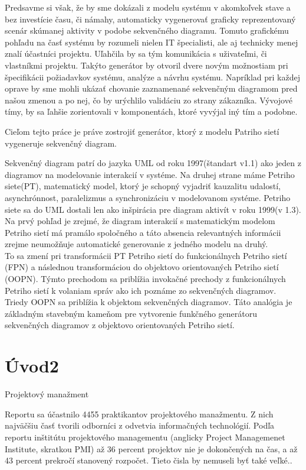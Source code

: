 Predsavme si však, že by sme dokázali z modelu systému v akomkoľvek stave a bez investície času, či námahy, automaticky vygenerovať graficky reprezentovaný scenár skúmanej aktivity v podobe sekvenčného diagramu. Tomuto grafickému pohľadu na časť systému by rozumeli nielen IT špecialisti, ale aj technicky menej znalí účastníci projektu. Uľahčila by sa tým komunikácia s uživateľmi, či vlastníkmi projektu. Takýto generátor by otvoril dvere novým možnostiam pri špecifikácii požiadavkov systému, analýze a návrhu systému. Napríklad pri každej oprave by sme mohli ukázať chovanie zaznamenané sekvenčným diagramom pred našou zmenou a po nej, čo by urýchlilo validáciu zo strany zákazníka. Vývojové tímy, by sa ľahšie zorientovali v komponentách, ktoré vyvýjal iný tím a podobne.

Cieľom tejto práce je práve zostrojiť generátor, ktorý z modelu Patriho sietí vygeneruje sekvenčný diagram.

Sekvenčný diagram patrí do jazyka UML od roku 1997(štandart v1.1) ako jeden z diagramov na modelovanie interakcií v systéme. Na druhej strane máme Petriho siete(PT), matematický model, ktorý je schopný vyjadriť kauzalitu udalostí, asynchrónnost, paralelizmus a synchronizáciu v modelovanom systéme. Petriho siete sa do UML dostali len ako inšpirácia pre diagram aktivít v roku 1999(v 1.3). Na prvý pohľad je zrejmé, že diagram interakcií s matematickým modelom Petriho sietí má pramálo spoločného a táto absencia relevantných informácii zrejme neumožňuje automatické generovanie z jedného modelu na druhý. \\

To sa zmení pri transformácii PT Petriho sietí do  funkcionálnych Petriho sietí (FPN) a následnou transformáciou do objektovo orientovaných Petriho sietí (OOPN). Týmto prechodom sa priblížia invokačné prechody z funkcionálnych Petriho sietí k volaniam správ ako ich poznáme zo sekvenčných diagramov. Triedy OOPN sa priblížia k objektom sekvenčných diagramov. Táto analógia je základným stavebným kameňom pre vytvorenie funkčného generátoru sekvenčných diagramov z objektovo orientovaných Petriho sietí.

\chapter{Úvod2}

Projektový manažment

Reportu sa účastnilo 4455 praktikantov projektového manažmentu. Z nich najväčšiu časť tvorili odborníci z odvetvia informačných technológií.
Podľa reportu inštitútu projektového managementu (anglicky Project Managemenet Institute, skratkou PMI) až 36 percent projektov nie je dokončených na čas, a až 43 percent prekročí stanovený rozpočet. Tieto čisla by nemuseli byť také veľké..

